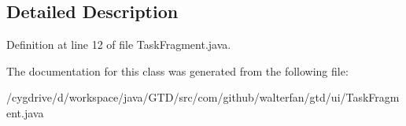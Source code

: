 \subsection{Detailed Description}


Definition at line 12 of file Task\-Fragment.\-java.



The documentation for this class was generated from the following file\-:\begin{DoxyCompactItemize}
\item 
/cygdrive/d/workspace/java/\-G\-T\-D/src/com/github/walterfan/gtd/ui/Task\-Fragment.\-java\end{DoxyCompactItemize}
